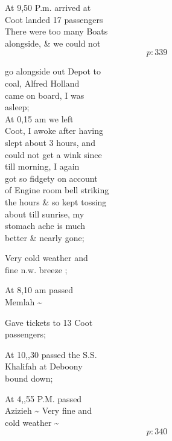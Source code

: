\documentclass{report}
\begin{document}
	\par{
 	At 9,50 P.m. arrived at\ \\Coot landed 17 passengers\ \\There were too many Boats\ \\alongside, \& we could not\ \\
  \[p: 339 \]

	}


	\par{
 	go alongside out Depot to\ \\coal, Alfred Holland\ \\came on board, I was\ \\asleep;\ \\At 0,15 am we left\ \\Coot, I awoke after having\ \\slept about 3 hours, and\ \\could not get a wink since\ \\till morning, I again\ \\got so fidgety on account\ \\of Engine room bell striking\ \\the hours \& so kept tossing\ \\about till sunrise, my\ \\stomach ache is much\ \\better \& nearly gone;\ \\
	}

	\par{
 	Very cold weather and\ \\fine n.w. breeze ;\ \\
	}

	\par{
 	At 8,10 am passed\ \\Memlah \~{}\ \\
	}

	\par{
 	Gave tickets to 13 Coot\ \\passengers;\ \\
	}

	\par{
 	At 10,,30 passed the S.S.\ \\Khalifah at Deboony\ \\bound down;\ \\
	}

	\par{
 	At 4,,55 P.M. passed\ \\Azizieh \~{} Very fine and\ \\cold weather \~{}\ \\
  \[p: 340 \]

	}
\end{document}
